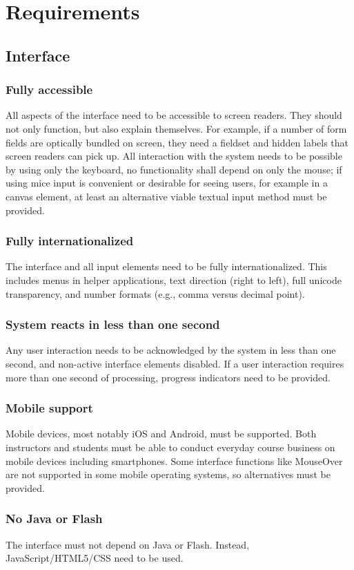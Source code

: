 \chapter{Requirements}
\section{Interface}
\subsection{Fully accessible}
All aspects of the interface need to be accessible to screen readers. They should not only function, but also explain themselves. For example, if a number of form fields are optically bundled on screen, they need a fieldset and hidden labels that screen readers can pick up. All interaction with the system needs to be possible by using only the keyboard, no functionality shall depend on only the mouse; if using mice input is convenient or desirable for seeing users, for example in a canvas element, at least an alternative viable textual input method must be provided.
\subsection{Fully internationalized}
The interface and all input elements need to be fully internationalized. This includes menus in helper applications, text direction (right to left), full unicode transparency, and number formats (e.g., comma versus decimal point).
\subsection{System reacts in less than one second}
Any user interaction needs to be acknowledged by the system in less than one second, and non-active interface elements disabled. If a user interaction requires more than one second of processing, progress indicators need to be provided.
\subsection{Mobile support}
Mobile devices, most notably iOS and Android, must be supported. Both instructors and students must be able to conduct everyday course business on mobile devices including smartphones. Some interface functions like MouseOver are not supported in some mobile operating systems, so alternatives must be provided.
\subsection{No Java or Flash}
The interface must not depend on Java or Flash. Instead, JavaScript/HTML5/CSS need to be used.
